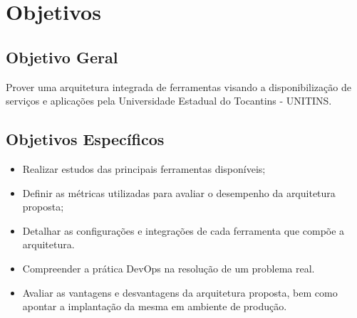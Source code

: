 \chapter{Objetivos}\label{cap:objetivos}

\section{Objetivo Geral }
Prover uma arquitetura integrada de ferramentas visando a disponibilização de serviços e aplicações pela Universidade Estadual do Tocantins - UNITINS.


\section{Objetivos Específicos}
\begin{itemize}
	\item Realizar estudos das principais ferramentas disponíveis;
	\item Definir as métricas utilizadas para avaliar o desempenho da arquitetura proposta;
	\item Detalhar as configurações e integrações de cada ferramenta que compõe a arquitetura.
	\item Compreender a prática DevOps na resolução de um problema real.
	\item Avaliar as vantagens e desvantagens da arquitetura proposta, bem como apontar a implantação da mesma em ambiente de produção.
\end{itemize}
